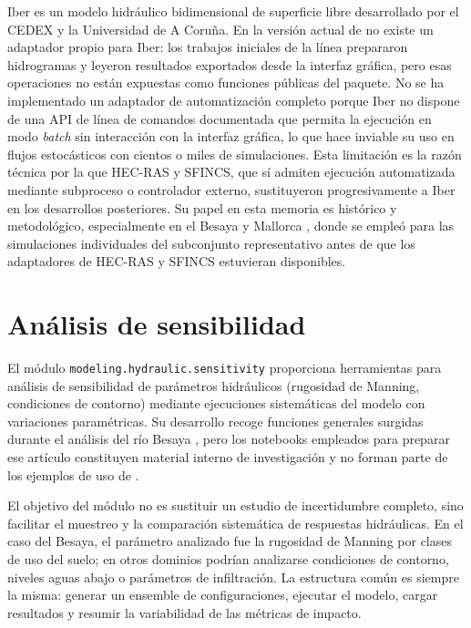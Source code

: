 Iber \parencite{blade2014iber} es un modelo hidráulico bidimensional de superficie libre desarrollado por el CEDEX y la Universidad de A Coruña. En la versión actual de \pyhydra no existe un adaptador propio para Iber: los trabajos iniciales de la línea prepararon hidrogramas y leyeron resultados exportados desde la interfaz gráfica, pero esas operaciones no están expuestas como funciones públicas del paquete. No se ha implementado un adaptador de automatización completo porque Iber no dispone de una API de línea de comandos documentada que permita la ejecución en modo \textit{batch} sin interacción con la interfaz gráfica, lo que hace inviable su uso en flujos estocásticos con cientos o miles de simulaciones. Esta limitación es la razón técnica por la que HEC-RAS y SFINCS, que sí admiten ejecución automatizada mediante subproceso o controlador externo, sustituyeron progresivamente a Iber en los desarrollos posteriores. Su papel en esta memoria es histórico y metodológico, especialmente en el Besaya \parencite{navas2018besaya} y Mallorca \parencite{navas2019mallorca}, donde se empleó para las simulaciones individuales del subconjunto representativo antes de que los adaptadores de HEC-RAS y SFINCS estuvieran disponibles.

\section{Análisis de sensibilidad}
\label{sec:sensibilidad}

El módulo \texttt{modeling.hydraulic.sensitivity} proporciona herramientas para análisis de sensibilidad de parámetros hidráulicos (rugosidad de Manning, condiciones de contorno) mediante ejecuciones sistemáticas del modelo con variaciones paramétricas. Su desarrollo recoge funciones generales surgidas durante el análisis del río Besaya \parencite{navas2025roughness}, pero los notebooks empleados para preparar ese artículo constituyen material interno de investigación y no forman parte de los ejemplos de uso de \hydra.

El objetivo del módulo no es sustituir un estudio de incertidumbre completo, sino facilitar el muestreo y la comparación sistemática de respuestas hidráulicas. En el caso del Besaya, el parámetro analizado fue la rugosidad de Manning por clases de uso del suelo; en otros dominios podrían analizarse condiciones de contorno, niveles aguas abajo o parámetros de infiltración. La estructura común es siempre la misma: generar un ensemble de configuraciones, ejecutar el modelo, cargar resultados y resumir la variabilidad de las métricas de impacto.

